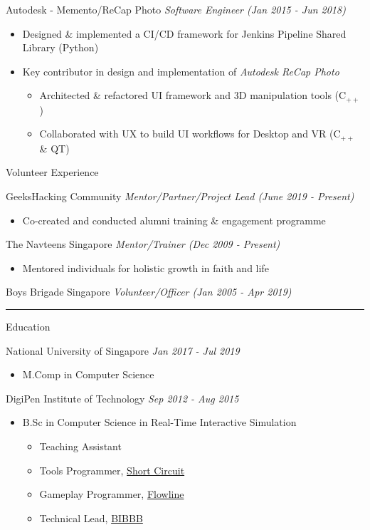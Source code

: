 \documentclass[letterpaper,11pt]{article}
\newcommand{\cvtitle}[1]{\Large\raggedright \textcolor{section_color}{#1}\\}
\newcommand{\cvhead}[1]{\large\raggedright \textcolor{subsection_color}{#1}\\}
\newcommand{\cvlist}[1]{\vspace{-12pt}\small \textcolor{item_color}{\begin{itemize}#1\end{itemize}}}
\newcommand{\cvli}[1]{\vspace{-4pt} \item{#1}}
\newcommand{\cvline}[0]{\noindent\rule{19cm}{0.4pt}}
\newcommand{\link}[2]{\textcolor{link_color}{\href{#1}{#2}}}
\newcommand{\qualifier}[1]{\hfill \textsl{\footnotesize #1}}
\begin{document}
\cvhead{Autodesk - Memento/ReCap Photo \qualifier{Software Engineer (Jan 2015 - Jun 2018)}}
\cvlist{
    \cvli{Designed \& implemented a CI/CD framework for Jenkins Pipeline Shared Library (Python)}
    \cvli{Key contributor in design and implementation of \textit{Autodesk ReCap Photo}
        \vspace{12pt}
        \cvlist{
            \cvli{Architected \& refactored UI framework and 3D manipulation tools (C$_{++}$)}
            \cvli{Collaborated with UX to build UI workflows for Desktop and VR (C$_{++}$ \& QT)}
        }
    }
}

\cvtitle{Volunteer Experience}

\cvhead{GeeksHacking Community \qualifier{Mentor/Partner/Project Lead (June 2019 - Present)}}
\cvlist{
    \cvli{Co-created and conducted alumni training \& engagement programme}
}

\cvhead{The Navteens Singapore \qualifier{Mentor/Trainer (Dec 2009 - Present)}}
\cvlist{
    \cvli{Mentored individuals for holistic growth in faith and life}
}

\cvhead{Boys Brigade Singapore \qualifier{Volunteer/Officer (Jan 2005 - Apr 2019)}}

\cvline

\cvtitle{Education}
\cvhead{National University of Singapore \qualifier{Jan 2017 - Jul 2019}}
\cvlist{
    \cvli{
        \cvhead{M.Comp in Computer Science}
    }
}

\cvhead{DigiPen Institute of Technology \qualifier{Sep 2012 - Aug 2015}}
\cvlist{
    \cvli{
        \cvhead{B.Sc in Computer Science in Real-Time Interactive Simulation}
        \cvlist{
            \cvli{Teaching Assistant}
            \cvli{Tools Programmer, \link{http://games.digipen.edu/games/shortcircuit}{Short Circuit}}
            \cvli{Gameplay Programmer, \link{http://games.digipen.edu/games/flowline}{Flowline}}
            \cvli{Technical Lead, \link{http://games.digipen.edu/games/bibbb}{BIBBB}}
        }
    }
}
\end{document}
